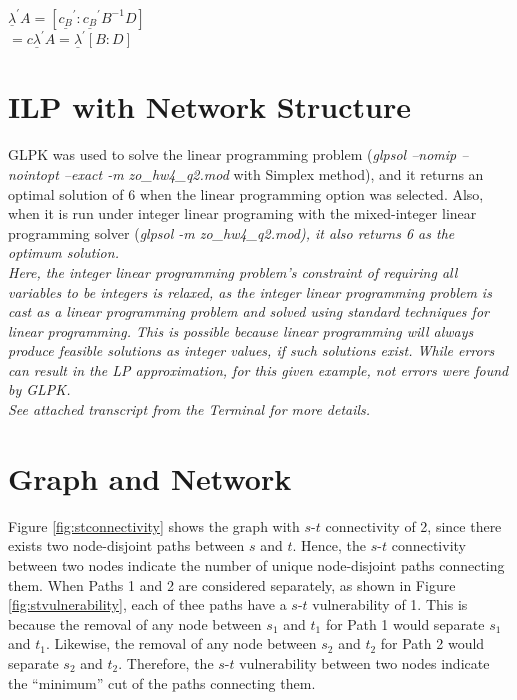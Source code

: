\documentclass[letter,12pt]{article}
\begin{document}
$\underline{\lambda}^{\prime} A = [ \underline{c_{B}}^{\prime} : \underline{c_{B}}^{\prime} B^{-1} D ]$ \\
$= c\underline{\lambda}^{\prime} A = \underline{\lambda}^{\prime} [ B:D ]$

\newpage
\section{ILP with Network Structure}
\label{sec:ilpnetworkstructure}

GLPK \cite{Makhorin2012} was used to solve the linear programming problem ({\it glpsol --nomip --nointopt --exact -m zo\_hw4\_q2.mod} with Simplex method), and it returns an optimal solution of 6 when the linear programming option was selected. Also, when it is run under integer linear programing with the mixed-integer linear programming solver (\it {glpsol -m zo\_hw4\_q2.mod}), it also returns 6 as the optimum solution. \\

Here, the integer linear programming problem's constraint of requiring all variables to be integers is relaxed, as the integer linear programming problem is cast as a linear programming problem and solved using standard techniques for linear programming. This is possible because linear programming will always produce feasible solutions as integer values, if such solutions exist. While errors can result in the LP approximation, for this given example, not errors were found by GLPK. \\

See attached transcript from the Terminal for more details.






\newpage
\section{Graph and Network}
\label{sec:graphnnetwork}

Figure \ref{fig:stconnectivity} shows the graph with $s$-$t$ connectivity of 2, since there exists two node-disjoint paths between $s$ and $t$. Hence, the $s$-$t$ connectivity between two nodes indicate the number of unique node-disjoint paths connecting them. When Paths 1 and 2 are considered separately, as shown in Figure \ref{fig:stvulnerability}, each of thee paths have a $s$-$t$ vulnerability of 1. This is because the removal of any node between $s_{1}$ and $t_{1}$ for Path 1 would separate $s_{1}$ and $t_{1}$. Likewise, the removal of any node between $s_{2}$ and $t_{2}$ for Path 2 would separate $s_{2}$ and $t_{2}$. Therefore, the $s$-$t$ vulnerability between two nodes indicate the ``minimum'' cut of the paths connecting them.\\
\end{document}
